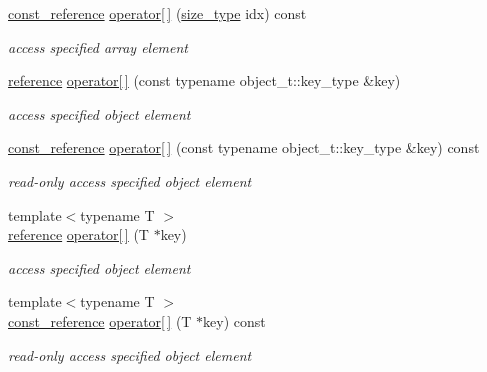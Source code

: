 \begin{DoxyCompactItemize}
\hyperlink{classnlohmann_1_1basic__json_ab8a1c33ee7b154fc41ca2545aa9724e6}{const\+\_\+reference} \hyperlink{classnlohmann_1_1basic__json_aa6c8c9e6331b3a33598453d90677975f}{operator\mbox{[}$\,$\mbox{]}} (\hyperlink{classnlohmann_1_1basic__json_a3ada29bca70b4965f6fd37ec1c8f85f7}{size\+\_\+type} idx) const 
\begin{DoxyCompactList}\small\item\em access specified array element \end{DoxyCompactList}\item 
\hyperlink{classnlohmann_1_1basic__json_a220ae98554a76205fb7f8822d36b2d5a}{reference} \hyperlink{classnlohmann_1_1basic__json_a3f45f3820c456ad2e3f3df2926564151}{operator\mbox{[}$\,$\mbox{]}} (const typename object\+\_\+t\+::key\+\_\+type \&key)
\begin{DoxyCompactList}\small\item\em access specified object element \end{DoxyCompactList}\item 
\hyperlink{classnlohmann_1_1basic__json_ab8a1c33ee7b154fc41ca2545aa9724e6}{const\+\_\+reference} \hyperlink{classnlohmann_1_1basic__json_a36c1d5c7297d06b49e1f13db26937585}{operator\mbox{[}$\,$\mbox{]}} (const typename object\+\_\+t\+::key\+\_\+type \&key) const 
\begin{DoxyCompactList}\small\item\em read-\/only access specified object element \end{DoxyCompactList}\item 
{\footnotesize template$<$typename T $>$ }\\\hyperlink{classnlohmann_1_1basic__json_a220ae98554a76205fb7f8822d36b2d5a}{reference} \hyperlink{classnlohmann_1_1basic__json_abc94831476f7b4d3efe6f2e9036c7188}{operator\mbox{[}$\,$\mbox{]}} (T $\ast$key)
\begin{DoxyCompactList}\small\item\em access specified object element \end{DoxyCompactList}\item 
{\footnotesize template$<$typename T $>$ }\\\hyperlink{classnlohmann_1_1basic__json_ab8a1c33ee7b154fc41ca2545aa9724e6}{const\+\_\+reference} \hyperlink{classnlohmann_1_1basic__json_a8e6dccc4acba93a6c55d4d12b66d3d22}{operator\mbox{[}$\,$\mbox{]}} (T $\ast$key) const 
\begin{DoxyCompactList}\small\item\em read-\/only access specified object element \end{DoxyCompactList}\item 

\end{DoxyCompactItemize}
